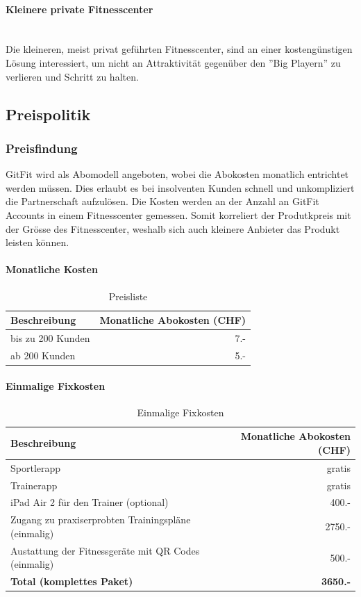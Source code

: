 \paragraph{Kleinere private Fitnesscenter} \hfill \\
Die kleineren, meist privat geführten Fitnesscenter, sind an einer kostengünstigen Lösung interessiert, um nicht an Attraktivität gegenüber den ''Big Playern'' zu verlieren und Schritt zu halten. 

\clearpage

\subsection{Preispolitik}\label{sec:preispolitik}
\subsubsection{Preisfindung}
GitFit wird als Abomodell angeboten, wobei die Abokosten monatlich entrichtet werden müssen. Dies erlaubt es bei insolventen Kunden schnell und unkompliziert die Partnerschaft aufzulösen. Die Kosten werden an der Anzahl an GitFit Accounts in einem Fitnesscenter gemessen. Somit korreliert der Produtkpreis mit der Grösse des Fitnesscenter, weshalb sich auch kleinere Anbieter das Produkt leisten können.

\paragraph{Monatliche Kosten} \hfill
\begin{table}[h]
	\centering
	\begin{tabu} to \linewidth {l r}
		\toprule 
		Beschreibung & Monatliche Abokosten (CHF) \\
		\midrule
		bis zu 200 Kunden & 7.- \\
		ab 200 Kunden & 5.- \\
		\bottomrule 
	\end{tabu} 
	\caption{Preisliste}
\end{table}

\paragraph{Einmalige Fixkosten} \hfill
\begin{table}[h]
	\centering
	\begin{tabu} to \linewidth {l r}
		\toprule 
		Beschreibung & Monatliche Abokosten (CHF) \\
		\midrule
		Sportlerapp & gratis \\
		Trainerapp & gratis \\
		iPad Air 2 für den Trainer (optional) & 400.- \\
		Zugang zu praxiserprobten Trainingspläne (einmalig) & 2750.- \\
		Austattung der Fitnessgeräte mit QR Codes (einmalig) & 500.-  \\
		\midrule
		\textbf{Total (komplettes Paket)} & \textbf{3650.-} \\
		\bottomrule 
	\end{tabu} 
	\caption{Einmalige Fixkosten}
\end{table}

